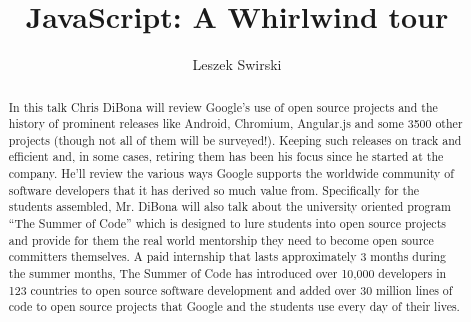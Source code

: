 \documentclass[a4paper,UKenglish]{oasics-v2016}
\title{JavaScript: A Whirlwind tour}
\author{Leszek Swirski}
\affil{Google Inc.}
\begin{document}
\maketitle
\begin{abstract}
In this talk Chris DiBona will review Google’s use of open source projects and the history of prominent releases like Android, Chromium, Angular.js and some 3500 other projects (though not all of them will be surveyed!). 
Keeping such releases on track and efficient and, in some cases, retiring them has been his focus since he started at the company.
He’ll review the various ways Google supports the worldwide community of software developers that it has derived so much value from. 
Specifically for the students assembled, Mr. DiBona will also talk about the university oriented program “The Summer of Code” which is designed 
to lure students into open source projects and provide for them the real world mentorship they need to become open source committers themselves. 
A paid internship that lasts approximately 3 months during the summer months, The Summer of Code has introduced over 10,000 developers in 123
countries to open source software development and added over 30 million lines of code to open source 
projects that Google and the students use every day of their lives.
\end{abstract}
\end{document}
